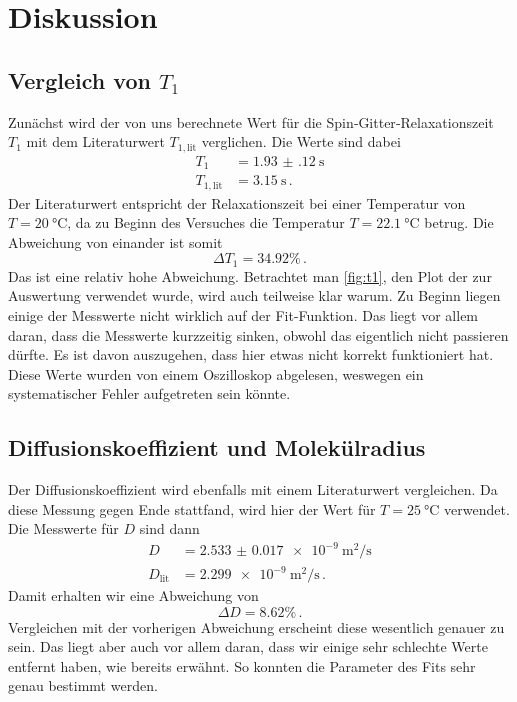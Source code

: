 \section{Diskussion}
\label{sec:Diskussion}

\subsection{Vergleich von \texorpdfstring{$T_1$}{T1}}

Zunächst wird der von uns berechnete Wert für die Spin‐Gitter‐Relaxationszeit $T_1$ mit dem Literaturwert $T_{1,\text{lit}}$ verglichen. \cite{T1}
Die Werte sind dabei 
\begin{align*}
    T_1 &= \SI{1.93(12)}{\second} \\
    T_{1,\text{lit}} &= \SI{3.15}{\second} \, .
\end{align*}
Der Literaturwert entspricht der Relaxationszeit bei einer Temperatur von $T = \SI{20}{\celsius}$, da zu Beginn des Versuches die Temperatur 
$T = \SI{22.1}{\celsius}$ betrug.
Die Abweichung von einander ist somit
\begin{equation}
    \Delta T_1 = \num{34.92} \% \, .
\end{equation}
Das ist eine relativ hohe Abweichung.
Betrachtet man \autoref{fig:t1}, den Plot der zur Auswertung verwendet wurde, wird auch teilweise klar warum.
Zu Beginn liegen einige der Messwerte nicht wirklich auf der Fit-Funktion.
Das liegt vor allem daran, dass die Messwerte kurzzeitig sinken, obwohl das eigentlich nicht passieren dürfte.
Es ist davon auszugehen, dass hier etwas nicht korrekt funktioniert hat. 
Diese Werte wurden von einem Oszilloskop abgelesen, weswegen ein systematischer Fehler aufgetreten sein könnte.

\subsection{Diffusionskoeffizient und Molekülradius}

Der Diffusionskoeffizient wird ebenfalls mit einem Literaturwert vergleichen. 
Da diese Messung gegen Ende stattfand, wird hier der Wert für $T = \SI{25}{\celsius}$ verwendet. \cite{D}
Die Messwerte für $D$ sind dann
\begin{align*}
    D &= \SI{2.533(17)e-9}{\meter\squared\per\second} \\
    D_\text{lit} &= \SI{2.299e-9}{\meter\squared\per\second} \, .
\end{align*}
Damit erhalten wir eine Abweichung von 
\begin{equation}
    \Delta D = \num{8.62} \% \, .
\end{equation}
Vergleichen mit der vorherigen Abweichung erscheint diese wesentlich genauer zu sein. 
Das liegt aber auch vor allem daran, dass wir einige sehr schlechte Werte entfernt haben, wie bereits erwähnt. 
So konnten die Parameter des Fits sehr genau bestimmt werden.

